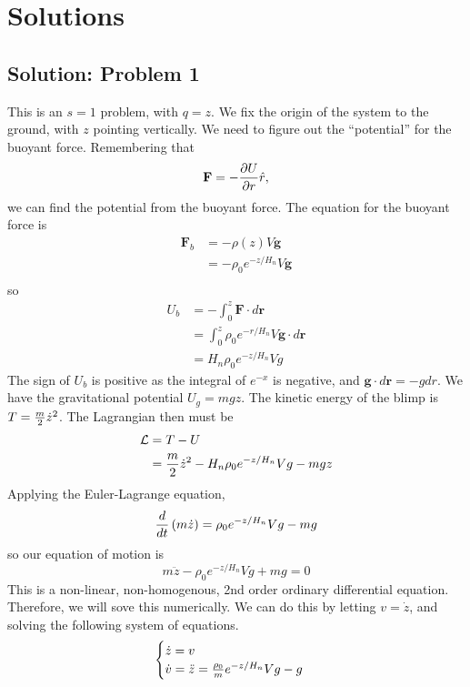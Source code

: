 \documentclass[titlepage]{article}
\begin{document}
\newpage

\section{Solutions}

\subsection{Solution: Problem 1}

This is an $s = 1$ problem, with $q = z$. We fix the origin of the system to the ground, with $z$ pointing vertically. We need to figure out the ``potential'' for the buoyant force. Remembering that
\[
    \textbf{F} = - {\partial U \over \partial r} \hat{r},
\]
we can find the potential from the buoyant force. The equation for the buoyant force is
\[
    \begin{split}
        \textbf{F}_b &= - \rho(z) V \textbf{g} \\
        &= - \rho_{0} e^{-z / H_{n}} V \textbf{g} \\
    \end{split}
\]
so
\[
    \begin{split}
        U_b &= - \int_0^z \textbf{F} \cdot d\textbf{r} \\
        &= \int_0^z \rho_{0} e^{-r / H_{n}} V \textbf{g} \cdot d\textbf{r} \\
        &= H_n \rho_0 e^{-z/H_n} V g
    \end{split}
\]
The sign of $U_b$ is positive as the integral of $e^{-x}$ is negative, and $\textbf{g} \cdot d\textbf{r} = -g dr$. We have the gravitational potential $U_g = mgz$. The kinetic energy of the blimp is $T = {m \over 2} \dot{z}^2$. The Lagrangian then must be
\[
    \begin{split}
        \mathcal{L} &= T - U \\
        &= {m \over 2} \dot{z}^2 - H_n \rho_0 e^{-z/H_n} V g - mgz
    \end{split}
\]
Applying the Euler-Lagrange equation,
\[
    {d \over dt} \left( m\dot{z} \right) = \rho_0 e^{-z / H_n} V g - mg
\]
so our equation of motion is
\[
    m\ddot{z} - \rho_0 e^{-z / H_n} V g + mg = 0
\]
This is a non-linear, non-homogenous, 2nd order ordinary differential equation. Therefore, we will sove this numerically. We can do this by letting $v = \dot{z}$, and solving the following system of equations. 
\[
    \begin{cases}
        \dot{z} = v \\
        \dot{v} = \ddot{z} = {\rho_0 \over m} e^{-z / H_n} V g - g
    \end{cases}
\]
\end{document}
